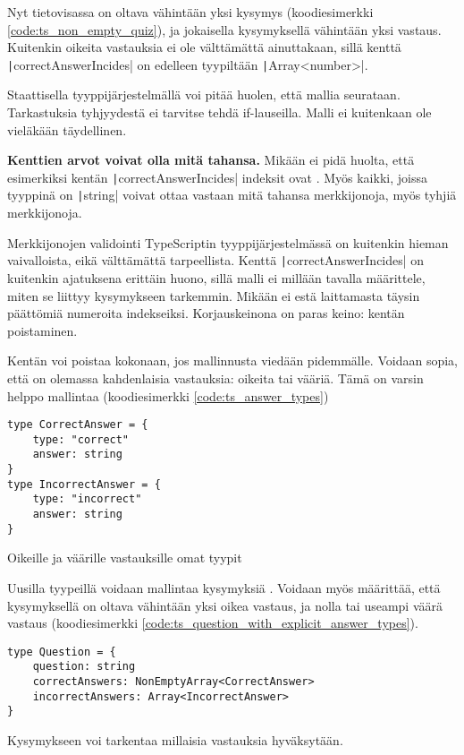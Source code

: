 Nyt tietovisassa on oltava vähintään yksi kysymys (koodiesimerkki \ref{code:ts_non_empty_quiz}), ja jokaisella kysymyksellä vähintään yksi vastaus. Kuitenkin oikeita vastauksia ei ole välttämättä ainuttakaan, sillä kenttä \texttt|correctAnswerIncides| on edelleen tyypiltään \texttt|Array<number>|.

Staattisella tyyppijärjestelmällä voi pitää huolen, että mallia seurataan. Tarkastuksia tyhjyydestä ei tarvitse tehdä if-lauseilla. Malli ei kuitenkaan ole vieläkään täydellinen.

\textbf{Kenttien arvot voivat olla mitä tahansa.} Mikään ei pidä huolta, että esimerkiksi kentän \texttt|correctAnswerIncides| indeksit ovat . Myös kaikki, joissa tyyppinä on \texttt|string| voivat ottaa vastaan mitä tahansa merkkijonoja, myös tyhjiä merkkijonoja.

Merkkijonojen validointi TypeScriptin tyyppijärjestelmässä on kuitenkin hieman vaivalloista, eikä välttämättä tarpeellista. Kenttä \texttt|correctAnswerIncides| on kuitenkin ajatuksena erittäin huono, sillä malli ei millään tavalla määrittele, miten se liittyy kysymykseen tarkemmin. Mikään ei estä laittamasta täysin päättömiä numeroita  indekseiksi. Korjauskeinona on paras keino: kentän poistaminen.

Kentän voi poistaa kokonaan, jos mallinnusta viedään pidemmälle. Voidaan sopia, että on olemassa kahdenlaisia vastauksia: oikeita tai vääriä. Tämä on varsin helppo mallintaa (koodiesimerkki \ref{code:ts_answer_types})

\begin{code}
    \begin{verbatim}
type CorrectAnswer = {
    type: "correct"
    answer: string
}
type IncorrectAnswer = {
    type: "incorrect"
    answer: string
}
    \end{verbatim}
    \caption{Oikeille ja väärille vastauksille omat tyypit}
    \label{code:ts_answer_types}
\end{code}

Uusilla tyypeillä voidaan mallintaa kysymyksiä . Voidaan myös määrittää, että kysymyksellä on oltava vähintään yksi oikea vastaus, ja nolla tai useampi väärä vastaus (koodiesimerkki \ref{code:ts_question_with_explicit_answer_types}).

\begin{code}
    \begin{verbatim}
type Question = {
    question: string
    correctAnswers: NonEmptyArray<CorrectAnswer>
    incorrectAnswers: Array<IncorrectAnswer>
}
    \end{verbatim}
    \caption{Kysymykseen voi tarkentaa millaisia vastauksia hyväksytään.}
    \label{code:ts_question_with_explicit_answer_types}
\end{code}

